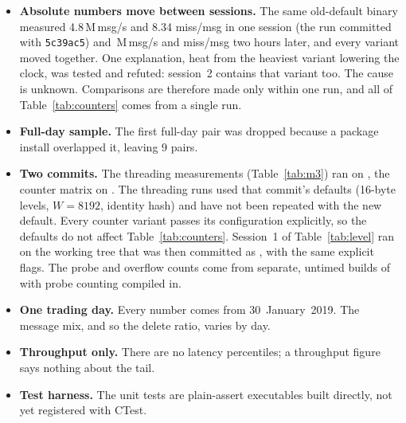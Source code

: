 \documentclass[10pt,a4paper]{article}
\newcommand{\code}[1]{\texttt{#1}}
\begin{document}
\begin{itemize}
        A previous version of this paper also concluded that ladder width makes no difference.
        The compile flag that sets the width was never read: the header hard-coded 8192, so the sweep compared four identical binaries, and their spread was run-to-run noise.
        A commit message described the guard that would have made the flag work, but the guard was never in the code.
        The width results here come from binaries that were checked to print the width they were asked for (Section~\ref{sec:method}).
        That version's counters were also counted for user and kernel; all counter results here are user space only and are not directly comparable with it.
  \item \textbf{Absolute numbers move between sessions.} The same old-default binary measured 4.8\,M\,msg/s and 8.34 miss/msg in one session (the run committed with \code{5c39ac5})
        and \StwoBaseR\,M\,msg/s and \StwoBaseP{} miss/msg two hours later, and every variant moved together.
        One explanation, heat from the heaviest variant lowering the clock, was tested and refuted: session~2 contains that variant too. The cause is unknown.
        Comparisons are therefore made only within one run, and all of Table~\ref{tab:counters} comes from a single run.
  \item \textbf{Full-day sample.} The first full-day pair was dropped because a package install overlapped it, leaving 9 pairs.
  \item \textbf{Two commits.} The threading measurements (Table~\ref{tab:m3}) ran on \code{\Commit}, the counter matrix on \code{\CountersCommit}.
        The threading runs used that commit's defaults (16-byte levels, $W{=}8192$, identity hash) and have not been repeated with the new default.
        Every counter variant passes its configuration explicitly, so the defaults do not affect Table~\ref{tab:counters}.
        Session~1 of Table~\ref{tab:level} ran on the working tree that was then committed as \code{\CountersCommit}, with the same explicit flags.
        The probe and overflow counts come from separate, untimed builds of \code{\CountersCommit} with probe counting compiled in.
  \item \textbf{One trading day.} Every number comes from 30~January~2019. The message mix, and so the delete ratio, varies by day.
  \item \textbf{Throughput only.} There are no latency percentiles; a throughput figure says nothing about the tail.
  \item \textbf{Test harness.} The unit tests are plain-assert executables built directly, not yet registered with CTest.
\end{itemize}
\end{document}
